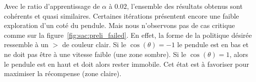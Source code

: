 Avec le ratio d'apprentissage de \(\alpha\) à $0.02$, l'ensemble des résultats obtenus sont cohérents et quasi similaires. Certaines itérations présentent encore une faible exploration d'un coté du pendule. Mais nous n'observons pas de cas critique comme sur la figure~\ref{fig:sac:preli_failed}. En effet, la forme de la politique désirée ressemble à un \(>\) de couleur clair. Si le \(\cos(\theta) = -1\) le pendule est en bas et ne doit pas être à une vitesse faible (une zone sombre). Si le \(\cos(\theta) = 1\), alors le pendule est en haut et doit alors rester immobile. Cet état est à favoriser pour maximiser la récompense (zone claire).